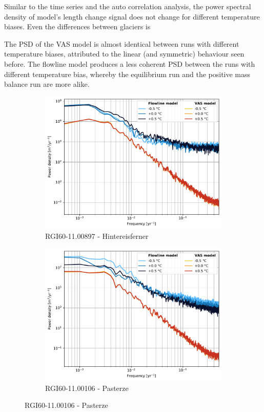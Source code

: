       Similar to the time series and the auto correlation analysis, the power spectral density of \vas{} model’s length change signal does not change for different temperature biases. Even the differences between glaciers is 

      The PSD of the VAS model is almost identical between runs with different temperature biases, attributed to the linear (and symmetric) behaviour seen before. The flowline model produces a less coherent PSD between the runs with different temperature bias, whereby the equilibrium run and the positive mass balance run are more alike.


      \begin{figure}[htp]
        \centering
        \begin{subfigure}[b]{0.48\textwidth}
          \caption{RGI60-11.00897 - Hintereisferner}
          \label{fig:psd:hintereisferner}
          \centering
          \includegraphics[width=\textwidth]{../plots/final_plots/psd/Hintereisferner.pdf}
        \end{subfigure}
        \hfill
        \begin{subfigure}[b]{0.48\textwidth}
          \caption{RGI60-11.00106 - Pasterze}
          \label{fig:psd:pasterze}
          \centering
          \includegraphics[width=\textwidth]{../plots/final_plots/psd/Pasterze.pdf}

\end{subfigure}
\end{figure}
